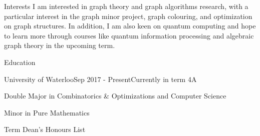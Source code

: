 \documentclass{cv}
\begin{document}
\begin{rSection}{Interests}
	I am interested in graph theory and graph algorithms research, with a particular interest in the graph minor project, graph colouring, and optimization on graph structures. In addition, I am also keen on quantum computing and hope to learn more through courses like quantum information processing and algebraic graph theory in the upcoming term.
\end{rSection}

\begin{rSection}{Education}

\begin{rSubsection}{University of Waterloo}{Sep 2017 - Present}{Currently in term 4A}{}
	\item Double Major in Combinatorics \& Optimizations and Computer Science
	\item Minor in Pure Mathematics
	\item Term Dean's Honours List
\end{rSubsection}



\end{rSection}
\end{document}
